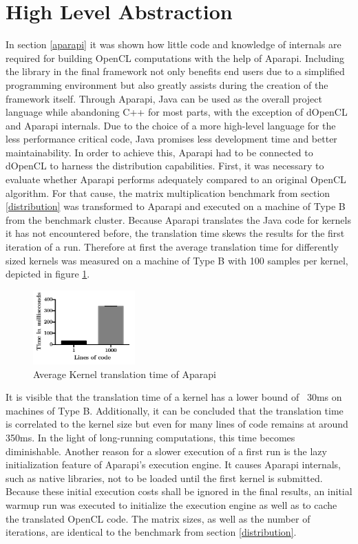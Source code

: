 \section{High Level Abstraction}
\label{abstraction}

In section \ref{aparapi} it was shown how little code and knowledge of internals are required for building OpenCL computations with the help of Aparapi. Including the library in the final framework not only benefits end users due to a simplified programming environment but also greatly assists during the creation of the framework itself. Through Aparapi, Java can be used as the overall project language while abandoning C++ for most parts, with the exception of dOpenCL and Aparapi internals. Due to the choice of a more high-level language for the less performance critical code, Java promises less development time and better maintainability. In order to achieve this, Aparapi had to be connected to dOpenCL to harness the distribution capabilities. First, it was necessary to evaluate whether Aparapi performs adequately compared to an original OpenCL algorithm. For that cause, the matrix multiplication benchmark from section \ref{distribution} was transformed to Aparapi and executed on a machine of Type B from the benchmark cluster. Because Aparapi translates the Java code for kernels it has not encountered before, the translation time skews the results for the first iteration of a run. Therefore at first the average translation time for differently sized kernels was measured on a machine of Type B with 100 samples per kernel, depicted in figure \ref{img:aparapi_translation}.

\begin{figure}[!htb]
	\includegraphics[width=0.35\textwidth]{images/aparapi_translation.pdf}
	\centering
	\caption{Average Kernel translation time of Aparapi}
	\label{img:aparapi_translation}
\end{figure}

It is visible that the translation time of a kernel has a lower bound of ~30ms on machines of Type B. Additionally, it can be concluded that the translation time is correlated to the kernel size but even for many lines of code remains at around 350ms. In the light of long-running computations, this time becomes diminishable. Another reason for a slower execution of a first run is the lazy initialization feature of Aparapi's execution engine. It causes Aparapi internals, such as native libraries, not to be loaded until the first kernel is submitted. Because these initial execution costs shall be ignored in the final results, an initial warmup run was executed to initialize the execution engine as well as to cache the translated OpenCL code. The matrix sizes, as well as the number of iterations, are identical to the benchmark from section \ref{distribution}.

